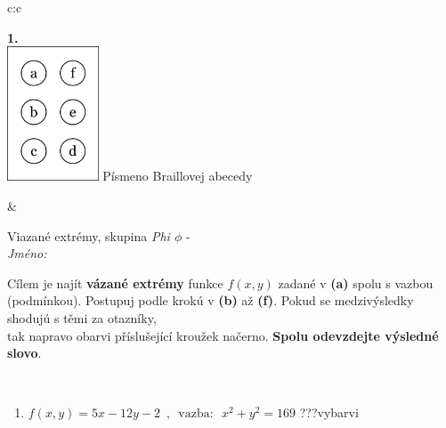 \documentclass[10pt]{report}
\begin{document}
\begin{tabular}{c:c}
\begin{minipage}[c][104.5mm][t]{0.5\linewidth}
\begin{center}
\begin{minipage}{0.79\linewidth}
\begin{center}
\begin{varwidth}{\linewidth}
\begin{enumerate}
\end{enumerate}
\end{varwidth}
\end{center}
\end{minipage}
\begin{minipage}{0.20\linewidth}
\begin{center}
{\Huge\bfseries 1.} \\[2mm]
\includegraphics[height=40mm]{../images/braille.png}
{\small Písmeno Braillovej abecedy}
\end{center}
\end{minipage}
\end{center}
\end{minipage}
&
\begin{minipage}[c][104.5mm][t]{0.5\linewidth}
\begin{center}
\vspace{7mm}
{\huge Viazané extrémy, skupina \textit{Phi $\phi$} -}\\[5mm]
\textit{Jméno:}\phantom{xxxxxxxxxxxxxxxxxxxxxxxxxxxxxxxxxxxxxxxxxxxxxxxxxxxxxxxxxxxxxxxxx}\\[5mm]
\begin{minipage}{0.95\linewidth}
\begin{center}
Cílem je najít \textbf{vázané extrémy} funkce $f(x,y)$ zadané v \textbf{(a)} spolu s vazbou (podmínkou). Postupuj podle krokú v \textbf{(b)} až \textbf{(f)}. Pokud se medzivýsledky shodujú s těmi za otazníky,\\tak napravo obarvi příslušející kroužek načerno. \textbf{Spolu odevzdejte výsledné slovo}.
\end{center}
\end{minipage}
\\[1mm]
\begin{minipage}{0.79\linewidth}
\begin{center}
\begin{varwidth}{\linewidth}
\begin{enumerate}
\normalsize
\item $f(x,y)=5x-12y-2 \enspace , \enspace \mathrm{vazba:} \enspace x^2+y^2=169$\quad \dotfill\; ???\;\dotfill \quad vybarvi

\end{enumerate}
\end{varwidth}
\end{center}
\end{minipage}
\end{center}
\end{minipage}
\end{tabular}
\end{document}
